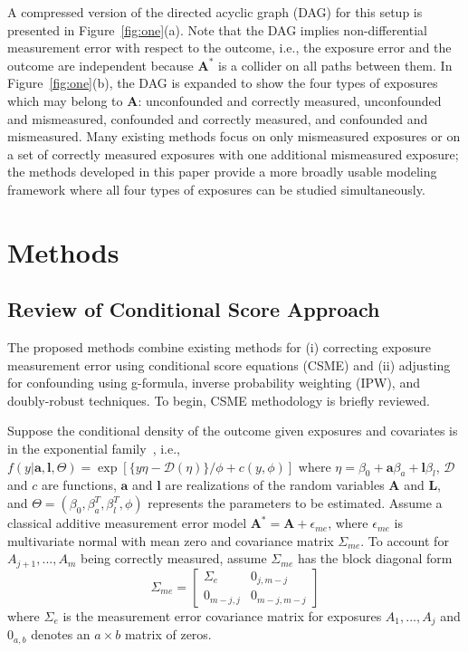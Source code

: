 \documentclass[useAMS,usenatbib,referee]{biom}
\begin{document}
A compressed version of the directed acyclic graph (DAG) for this setup is presented in Figure~\ref{fig:one}(a). Note that the DAG implies non-differential measurement error with respect to the outcome, i.e., the exposure error and the outcome are independent because $\bm{A}^{*}$ is a collider on all paths between them. In Figure~\ref{fig:one}(b), the DAG is expanded to show the four types of exposures which may belong to $\bm{A}$: unconfounded and correctly measured, unconfounded and mismeasured, confounded and correctly measured, and confounded and mismeasured. Many existing methods focus on only mismeasured exposures or on a set of correctly measured exposures with one additional mismeasured exposure; the methods developed in this paper provide a more broadly usable modeling framework where all four types of exposures can be studied simultaneously.

\section{Methods}
\label{s:methods}

\subsection{Review of Conditional Score Approach}

The proposed methods combine existing methods for (i) correcting exposure measurement error using conditional score equations (CSME) and (ii) adjusting for confounding using g-formula, inverse probability weighting (IPW), and doubly-robust techniques. To begin, CSME methodology is briefly reviewed.

Suppose the conditional density of the outcome given exposures and covariates is in the exponential family~\citep{mccullagh1989}, i.e., $f(y | \bm{a}, \bm{l}, \Theta) = \exp [ \{y\eta - \mathcal{D}(\eta)\}/ \phi + c(y, \phi) ]$ where $\eta = \beta_{0} + \bm{a}\beta_{a} + \bm{l}\beta_{l}$, $\mathcal{D}$ and $c$ are functions, $\bm{a}$ and $\bm{l}$ are realizations of the random variables $\bm{A}$ and $\bm{L}$, and $\Theta = (\beta_{0}, \beta^{T}_{a}, \beta^{T}_{l}, \phi)$ represents the parameters to be estimated. Assume a classical additive measurement error model $\bm{A}^{*} = \bm{A} + \epsilon_{me}$, where $\epsilon_{me}$ is multivariate normal with mean zero and covariance matrix $\Sigma_{me}$. To account for $A_{j+1}, ...,  A_{m}$ being correctly measured, assume $\Sigma_{me}$ has the block diagonal form
\begin{equation*}
    \Sigma_{me} =
    \begin{bmatrix}
    \Sigma_{e} & 0_{j,m-j} \\
    0_{m-j,j} & 0_{m-j,m-j}
    \end{bmatrix}
\end{equation*}
where $\Sigma_{e}$ is the measurement error covariance matrix for exposures $A_{1},...,A_{j}$ and $0_{a,b}$ denotes an $a \times b$ matrix of zeros.
\end{document}
